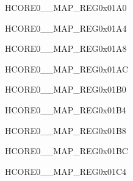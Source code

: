 \begin{register}{H}{CORE0\_\_MAP\_REG}{0x01A0}\label{regdesc:CORE0DMA2DINCH0INTMAPREG}
\end{register}\vspace{-3em}


\begin{register}{H}{CORE0\_\_MAP\_REG}{0x01A4}\label{regdesc:CORE0DMA2DINCH1INTMAPREG}
\end{register}\vspace{-3em}


\begin{register}{H}{CORE0\_\_MAP\_REG}{0x01A8}\label{regdesc:CORE0DMA2DOUTCH0INTMAPREG}
\end{register}\vspace{-3em}


\begin{register}{H}{CORE0\_\_MAP\_REG}{0x01AC}\label{regdesc:CORE0DMA2DOUTCH1INTMAPREG}
\end{register}\vspace{-3em}


\begin{register}{H}{CORE0\_\_MAP\_REG}{0x01B0}\label{regdesc:CORE0DMA2DOUTCH2INTMAPREG}
\end{register}\vspace{-3em}


\begin{register}{H}{CORE0\_\_MAP\_REG}{0x01B4}\label{regdesc:CORE0PSRAMMSPIINTMAPREG}
\end{register}\vspace{-3em}


\begin{register}{H}{CORE0\_\_MAP\_REG}{0x01B8}\label{regdesc:CORE0HPSYSREGINTMAPREG}
\end{register}\vspace{-3em}


\begin{register}{H}{CORE0\_\_MAP\_REG}{0x01BC}\label{regdesc:CORE0PCNTINTMAPREG}
\end{register}\vspace{-3em}




\begin{register}{H}{CORE0\_\_MAP\_REG}{0x01C4}\label{regdesc:CORE0HPPARLIORXINTMAPREG}
\end{register}\vspace{-3em}


